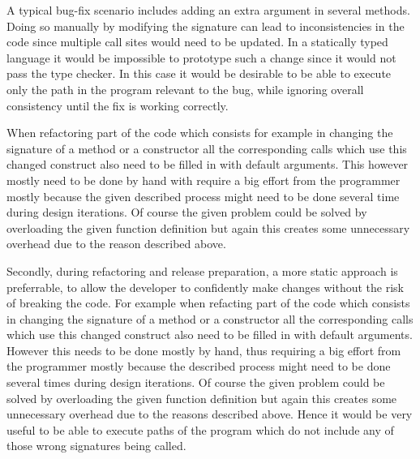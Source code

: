   A typical bug-fix scenario includes adding an extra argument in several methods. Doing so manually by modifying the signature can lead to inconsistencies in the code since multiple call sites would need to be updated. In a statically typed language it would be impossible to prototype such a change since it would not pass the type checker. In this case it would be desirable to be able to execute only the path in the program relevant to the bug, while ignoring overall consistency until the fix is working correctly.

  When refactoring part of the code which consists for example in changing the signature of a method or a constructor all the corresponding calls which use this changed construct also need to be filled in with default arguments. This however mostly need to be done by hand with require a big effort from the programmer mostly because the given described process might need to be done several time during design iterations. Of course the given problem could be solved by overloading the given function definition but again this creates some unnecessary overhead due to the reason described above.

  Secondly, during refactoring and release preparation, a more static approach is preferrable, to allow the developer to confidently make changes without the risk of breaking the code. For example when refacting part of the code which consists in changing the signature of a method or a constructor all the corresponding calls which use this changed construct also need to be filled in with default arguments. However this needs to be done mostly by hand, thus requiring a big effort from the programmer mostly because the described process might need to be done several times during design iterations. Of course the given problem could be solved by overloading the given function definition but again this creates some unnecessary overhead due to the reasons described above. Hence it would be very useful to be able to execute paths of the program which do not include any of those wrong signatures being called. %


